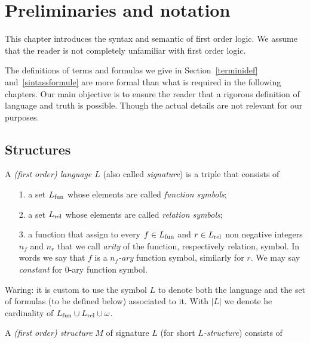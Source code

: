 \chapter{Preliminaries and notation}\label{termini}
This chapter introduces the syntax and semantic of first order logic. We assume that the reader is not completely unfamiliar with first order logic. 

The definitions of terms and formulas we give in Section~\ref{terminidef} and~\ref{sintassformule} are more formal than what is required in the following chapters. Our main objective is to ensure the reader that a rigorous definition of language and truth is possible. Though the actual details are not relevant for our purposes.


\section{Structures}

A \emph{(first order) language $L$\/}  (also called \emph{signature\/}) is a triple that consists of

\begin{itemize}
\item[1.] a set \emph{$L_{\rm fun}$} whose elements are called \emph{function symbols};
\item[2.] a set \emph{$L_{\rm rel}$\/} whose elements are called \emph{relation symbols};
\item[3.] a function that assign to every $f\in L_{\rm fun}$ and $r\in L_{\rm rel}$ non negative integers $n_f$ and $n_r$ that we call \emph{arity\/} of the function, respectively relation, symbol. In words we say that $f$ is a \emph{$n_f$-ary} function symbol, similarly for $r$. We may say \emph{constant\/} for $0$-ary function symbol.
\end{itemize}

Waring: it is custom to use the symbol \emph{$L$} to denote both the language and the set of formulas (to be defined below) associated to it. With \emph{$|L|$} we denote he cardinality of $L_{\rm fun}\cup L_{\rm rel}\cup\omega$.


A \emph{(first order) structure\/} $M$ of signature $L$ (for short \emph{$L$-structure}) consists of

